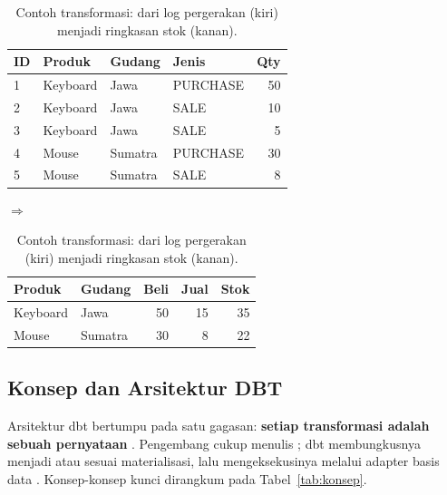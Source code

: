 \begin{table}[H]
\centering\small
\caption{Contoh transformasi: dari log pergerakan (kiri) menjadi ringkasan stok (kanan).}\label{tab:contohtransform}
\begin{tabular}{llllr}
\toprule
\textbf{ID} & \textbf{Produk} & \textbf{Gudang} & \textbf{Jenis} & \textbf{Qty} \\
\midrule
1 & Keyboard & Jawa & PURCHASE & 50 \\
2 & Keyboard & Jawa & SALE & 10 \\
3 & Keyboard & Jawa & SALE & 5 \\
4 & Mouse & Sumatra & PURCHASE & 30 \\
5 & Mouse & Sumatra & SALE & 8 \\
\bottomrule
\end{tabular}
\quad$\Rightarrow$\quad
\begin{tabular}{llrrr}
\toprule
\textbf{Produk} & \textbf{Gudang} & \textbf{Beli} & \textbf{Jual} & \textbf{Stok} \\
\midrule
Keyboard & Jawa & 50 & 15 & 35 \\
Mouse & Sumatra & 30 & 8 & 22 \\
\bottomrule
\end{tabular}
\end{table}

\subsection{Konsep dan Arsitektur DBT}
Arsitektur dbt bertumpu pada satu gagasan: \textbf{setiap transformasi adalah sebuah pernyataan }. Pengembang cukup menulis ; dbt membungkusnya menjadi  atau  sesuai materialisasi, lalu mengeksekusinya melalui adapter basis data \citep{dbtdocs}. Konsep-konsep kunci dirangkum pada Tabel~\ref{tab:konsep}.

